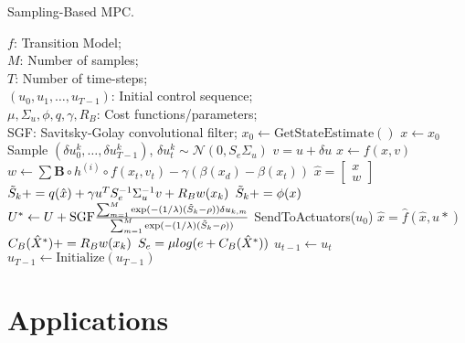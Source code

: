 \documentclass[english]{cccconf}
\begin{document}
\begin{algorithm}[!htbp]
\caption{Sampling-Based MPC.}
\begin{algorithmic}[1]
\Require $f$: Transition Model; \\
$M$: Number of samples; \\
$T$: Number of time-steps; \\
$(u_0, u_1, \ldots, u_{T-1})$: Initial control sequence; \\
$\mu, \Sigma_{u}, \phi, q, \gamma, R_B$: Cost functions/parameters; \\
SGF: Savitsky-Golay convolutional filter;
    \State $x_0 \gets \text{GetStateEstimate}()$
        \State $x \gets x_0$
        \State Sample $ (\delta u_0^k, \ldots, \delta u_{T-1}^k)$, $\delta u_t^k \sim \mathcal{N}(0, S_e\Sigma_u)$
            \State $v = u+\delta u$
            \State $x \gets f(x, v)$
            \State $w \gets \sum\mathbf{B} \circ h^{(i)} \circ  f(x_t, v_t)-\gamma(\beta(x_d)-\beta(x_t))$
            \State $\hat{x} = \begin{bmatrix} x \\ w \end{bmatrix}$
            \State $\Tilde{S}_k += q(\hat{x})+\gamma u_{}^T S_e^{-1}\Sigma_u^{-1} v+ R_B \space w({x}_k)$ 
        \EndFor
        \State $\Tilde S_k += \phi(x)$
    \EndFor
        \State $U^* \gets U + \text{SGF}  \frac{\sum_{m=1}^{M}\exp(-(1/\lambda)(\Tilde{S}_k-\rho))\delta u_{k,m}}{\sum_{m=1}^{M}\exp(-(1/\lambda)(\Tilde{S}_k-\rho))}$
    \EndFor
        \State SendToActuators($u_0$)
        \State $\hat{x}= \hat{f}(\hat{x}, u*) $
        \State $C_B(\hat{X}^*)+=R_B \space w({x}_k)$
    \EndFor
    \State $S_e = \mu \space log(e+ C_B(\hat{X}^*))$
            \State $u_{t-1} \gets u_t$
        \State $u_{T-1} \gets \text{Initialize}(u_{T-1})$
    \EndFor
\EndWhile
\end{algorithmic}
\end{algorithm}

\section{Applications} \label{Sec:app}
\end{document}
